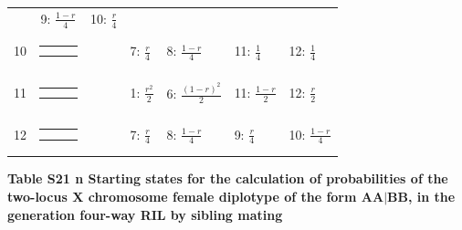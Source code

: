 \documentclass[9pt,letterpaper,twoside]{article}
\begin{document}
{\begin{center}
\begin{tabular}{cccllll}
& 9: $\frac{1-r}{4}$
& 10: $\frac{r}{4}$
\\
10 &
{\renewcommand{\arraystretch}{0.3}
\renewcommand{\tabcolsep}{0.5mm}
\parbox[b][3mm][c]{12mm}{
\begin{tabular}{|p{2mm}|p{2mm}||p{2mm}|} \hline
$\bullet$ & $\circ  $ &           \\
          & $\bullet$ & $\circ  $ \\ \hline
\end{tabular}}}
&
& 7: $\frac{r}{4}$
& 8: $\frac{1-r}{4}$
& 11: $\frac{1}{4}$
& 12: $\frac{1}{4}$
\\
11 &
{\renewcommand{\arraystretch}{0.3}
\renewcommand{\tabcolsep}{0.5mm}
\parbox[b][3mm][c]{12mm}{
\begin{tabular}{|p{2mm}|p{2mm}||p{2mm}|} \hline
$\bullet$ &           & $\circ  $ \\
$\circ  $ &           & $\bullet$ \\ \hline
\end{tabular}}}
&
& 1: $\frac{r^2}{2}$
& 6: $\frac{(1-r)^2}{2}$
& 11: $\frac{1-r}{2}$
& 12: $\frac{r}{2}$
\\
12 &
{\renewcommand{\arraystretch}{0.3}
\renewcommand{\tabcolsep}{0.5mm}
\parbox[b][3mm][c]{12mm}{
\begin{tabular}{|p{2mm}|p{2mm}||p{2mm}|} \hline
$\bullet$ &           & $\circ  $ \\
          & $\circ  $ & $\bullet$ \\ \hline
\end{tabular}}}
&
& 7: $\frac{r}{4}$
& 8: $\frac{1-r}{4}$
& 9: $\frac{r}{4}$
& 10: $\frac{1-r}{4}$
\\
\hline
\end{tabular}
\end{center}
}

\newpage

\noindent \textbf{Table S21 {\color{white} n} Starting states for the calculation of
probabilities of the two-locus X chromosome female diplotype of the form $\boldsymbol{AA|BB}$,
in the generation four-way RIL by sibling mating}

\bigskip
\end{document}
